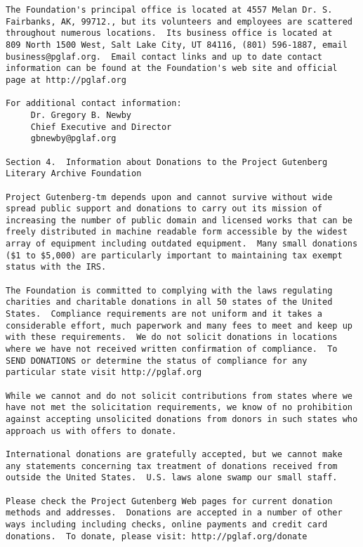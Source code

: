 \documentclass[oneside,12pt]{book}
\begin{document}
\begin{verbatim}
The Foundation's principal office is located at 4557 Melan Dr. S.
Fairbanks, AK, 99712., but its volunteers and employees are scattered
throughout numerous locations.  Its business office is located at
809 North 1500 West, Salt Lake City, UT 84116, (801) 596-1887, email
business@pglaf.org.  Email contact links and up to date contact
information can be found at the Foundation's web site and official
page at http://pglaf.org

For additional contact information:
     Dr. Gregory B. Newby
     Chief Executive and Director
     gbnewby@pglaf.org

Section 4.  Information about Donations to the Project Gutenberg
Literary Archive Foundation

Project Gutenberg-tm depends upon and cannot survive without wide
spread public support and donations to carry out its mission of
increasing the number of public domain and licensed works that can be
freely distributed in machine readable form accessible by the widest
array of equipment including outdated equipment.  Many small donations
($1 to $5,000) are particularly important to maintaining tax exempt
status with the IRS.

The Foundation is committed to complying with the laws regulating
charities and charitable donations in all 50 states of the United
States.  Compliance requirements are not uniform and it takes a
considerable effort, much paperwork and many fees to meet and keep up
with these requirements.  We do not solicit donations in locations
where we have not received written confirmation of compliance.  To
SEND DONATIONS or determine the status of compliance for any
particular state visit http://pglaf.org

While we cannot and do not solicit contributions from states where we
have not met the solicitation requirements, we know of no prohibition
against accepting unsolicited donations from donors in such states who
approach us with offers to donate.

International donations are gratefully accepted, but we cannot make
any statements concerning tax treatment of donations received from
outside the United States.  U.S. laws alone swamp our small staff.

Please check the Project Gutenberg Web pages for current donation
methods and addresses.  Donations are accepted in a number of other
ways including including checks, online payments and credit card
donations.  To donate, please visit: http://pglaf.org/donate



\end{verbatim}
\end{document}

